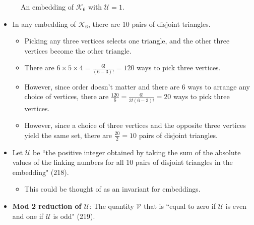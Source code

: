 \documentclass[titlepage]{article}
\numberwithin{figure}{section}
\numberwithin{table}{section}
\numberwithin{equation}{section}
\newcommand{\dq}[2]{``#1" (#2).}
\begin{document}
\begin{itemize}
\begin{figure}[h!]
        \caption{An embedding of $\mathcal{K}_6$ with $\mathcal{U}=1$.}
        \label{fig:k6u1}
    \end{figure}
    \begin{itemize}
        \item In any embedding of $\mathcal{K}_6$, there are 10 pairs of disjoint triangles.
        \begin{itemize}
            \item Picking any three vertices selects one triangle, and the other three vertices become the other triangle.
            \item There are $6\times 5\times 4=\frac{6!}{(6-3)!}=120$ ways to pick three vertices.
            \item However, since order doesn't matter and there are 6 ways to arrange any choice of vertices, there are $\frac{120}{6}=\frac{6!}{3!(6-3)!}=20$ ways to pick three vertices.
            \item However, since a choice of three vertices and the opposite three vertices yield the same set, there are $\frac{20}{2}=10$ pairs of disjoint triangles.
        \end{itemize}
        \item Let $\mathcal{U}$ be \dq{the positive integer obtained by taking the sum of the absolute values of the linking numbers for all 10 pairs of disjoint triangles in the embedding}{218}
        \begin{itemize}
            \item This could be thought of as an invariant for embeddings.
        \end{itemize}
        \item \textbf{Mod 2 reduction of $\mathcal{U}$}: The quantity $\mathcal{V}$ that is \dq{equal to zero if $\mathcal{U}$ is even and one if $\mathcal{U}$ is odd}{219}

\end{itemize}
\end{itemize}
\end{document}
